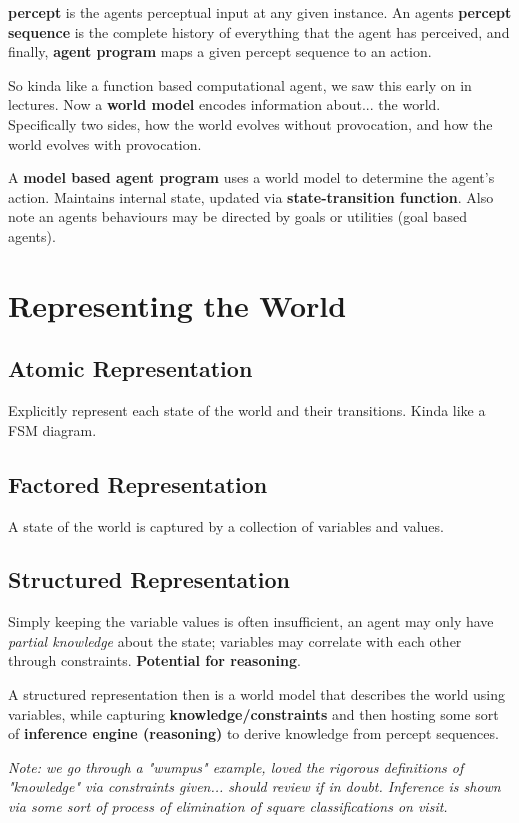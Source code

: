 \documentclass{article}
\begin{document}
\textbf{percept} is the agents perceptual input at any given instance. An agents \textbf{percept sequence} is the complete history of everything that the agent has perceived, and finally, \textbf{agent program} maps a given percept sequence to an action.

So kinda like a function based computational agent, we saw this early on in lectures. Now a \textbf{world model} encodes information about... the world. Specifically two sides, how the world evolves without provocation, and how the world evolves with provocation.

A \textbf{model based agent program} uses a world model to determine the agent's action. Maintains internal state, updated via \textbf{state-transition function}. Also note an agents behaviours may be directed by goals or utilities (goal based agents).

\section{Representing the World}

\subsection{Atomic Representation}
Explicitly represent each state of the world and their transitions. Kinda like a FSM diagram.

\subsection{Factored Representation}
A state of the world is captured by a collection of variables and values.

\subsection{Structured Representation}
Simply keeping the variable values is often insufficient, an agent may only have \emph{partial knowledge} about the state; variables may correlate with each other through constraints. \textbf{Potential for reasoning}.

A structured representation then is a world model that describes the world using variables, while capturing \textbf{knowledge/constraints} and then hosting some sort of \textbf{inference engine (reasoning)} to derive knowledge from percept sequences.

\emph{Note: we go through a "wumpus" example, loved the rigorous definitions of "knowledge" via constraints given... should review if in doubt. Inference is shown via some sort of process of elimination of square classifications on visit.}
\end{document}
